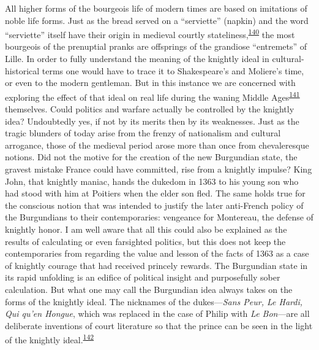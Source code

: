 All higher forms of the bourgeois life of modern times are based on
imitations of noble life forms. Just as the bread served on a
``serviette'' (napkin) and the word ``serviette'' itself have their
origin in medieval courtly
stateliness,\textsuperscript{\protect\hypertarget{10_Chapter_Three__THE_HEROIC_DREAM.xhtmlux5cux23id_1655}{\protect\hyperlink{23_NOTES.xhtmlux5cux23id_1656}{140}}}
the most bourgeois of the prenuptial pranks are offsprings of the
grandiose ``entremets'' of Lille. In order to fully understand the
meaning of the knightly ideal in cultural-historical terms one would
have to trace it to Shakespeare's and Moliere's time, or even to the
modern gentleman. But in this instance we are concerned with exploring
the effect of that ideal on real life during the waning Middle
Ages\textsuperscript{\protect\hypertarget{10_Chapter_Three__THE_HEROIC_DREAM.xhtmlux5cux23id_1653}{\protect\hyperlink{23_NOTES.xhtmlux5cux23id_1654}{141}}}
themselves. Could politics and warfare actually be controlled by the
knightly idea? Undoubtedly yes, if not by its merits then by its
weaknesses. Just as the tragic blunders of today arise from the frenzy
of nationalism and cultural arrogance, those of the medieval period
arose more than once from chevaleresque notions. Did not the motive for
the creation of the new Burgundian state, the gravest mistake France
could have committed, rise from a knightly impulse? King John, that
knightly maniac, hands the dukedom in 1363 to his young son who had
stood with him at Poitiers when the elder son fled. The same holds true
for the conscious notion that was intended to justify the later
anti-French policy of the Burgundians to their
contem\protect\hypertarget{10_Chapter_Three__THE_HEROIC_DREAM.xhtmlux5cux23page_105}{}{}poraries:
vengeance for Montereau, the defense of knightly honor. I am well aware
that all this could also be explained as the results of calculating or
even farsighted politics, but this does not keep the contemporaries from
regarding the value and lesson of the facts of 1363 as a case of
knightly courage that had received princely rewards. The Burgundian
state in its rapid unfolding is an edifice of political insight and
purposefully sober calculation. But what one may call the Burgundian
idea always takes on the forms of the knightly ideal. The nicknames of
the dukes---\emph{Sans Peur, Le Hardi, Qui qu'en Hongue}, which was
replaced in the case of Philip with \emph{Le Bon}---are all deliberate
inventions of court literature so that the prince can be seen in the
light of the knightly
ideal.\textsuperscript{\protect\hypertarget{10_Chapter_Three__THE_HEROIC_DREAM.xhtmlux5cux23id_1651}{\protect\hyperlink{23_NOTES.xhtmlux5cux23id_1652}{142}}}


